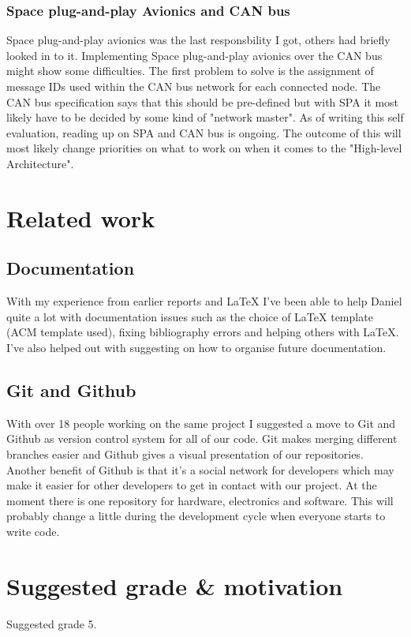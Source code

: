 \subsubsection{Space plug-and-play Avionics and CAN bus}
Space plug-and-play avionics was the last responsbility I got, others had briefly
looked in to it. Implementing Space plug-and-play avionics
over the CAN bus might show some difficulties. The first problem to solve is
the assignment of message IDs used within the CAN bus network for each connected
node. The CAN bus specification says that this should be pre-defined but with
SPA it most likely have to be decided by some kind of "network master". As of
writing this self evaluation, reading up on SPA and CAN bus is ongoing. The
outcome of this will most likely change priorities on what to work on when it
comes to the "High-level Architecture".

\section{Related work}
\subsection{Documentation}
With my experience from earlier reports and LaTeX I've been able to help Daniel
quite a lot with documentation issues such as the choice of LaTeX template
(ACM template used), fixing bibliography errors and helping
others with LaTeX. I've also helped out with suggesting on how to organise
future documentation.

\subsection{Git and Github}
With over 18 people working on the same project I suggested a move to Git and
Github as version control system for all of our code. Git makes merging
different branches easier and Github gives a visual presentation of our
repositories. Another benefit of Github is that it's a social network for
developers which may make it easier for other developers to get in contact
with our project. At the moment there is one repository for hardware, electronics
and software. This will probably change a little during the development cycle
when everyone starts to write code.

\section{Suggested grade \& motivation}
Suggested grade 5.

